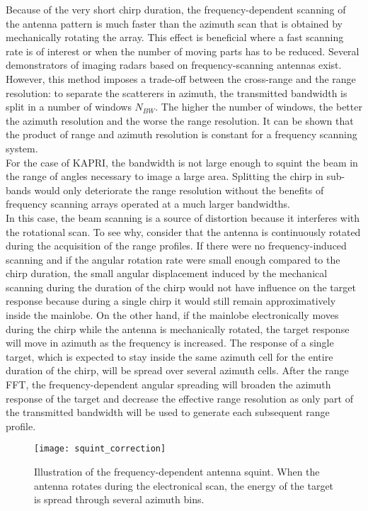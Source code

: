 Because of the very short chirp duration, the frequency-dependent scanning of the antenna pattern is much faster than the azimuth scan that is obtained by mechanically rotating the array. This effect is beneficial where a fast scanning rate is of interest or when the number of moving parts has to be reduced. Several demonstrators of imaging radars based on frequency-scanning antennas exist\cite{Yang2014,Yang2012,Mayer2003,Alvarez2013}. However, this method imposes a trade-off between the cross-range and the range resolution: to separate the scatterers in azimuth, the transmitted bandwidth is split in a number of windows $N_{BW}$. The higher the number of windows, the better the azimuth resolution and the worse the range resolution\cite{Alvarez2013}. It can be shown\cite{Mayer2003} that the product of range and azimuth resolution is constant for a frequency scanning system.\\
For the case of KAPRI, the bandwidth is not large enough to squint the beam in the range of angles necessary to image a large area. Splitting the chirp in sub-bands would only deteriorate the range resolution without the benefits of frequency scanning arrays operated at a much larger bandwidths.\\ 
In this case, the beam scanning is a source of distortion because it interferes with the rotational scan. To see why, consider that the antenna is continuously rotated during the acquisition of the range profiles. If there were no frequency-induced scanning and if the angular rotation rate were small enough compared to the chirp duration, the small angular displacement induced by the mechanical scanning during the duration of the chirp would not have influence on the target response because during a single chirp it would still remain approximatively inside the mainlobe. On the other hand, if the mainlobe electronically moves during the chirp while the antenna is mechanically rotated, the target response will move in azimuth as the frequency is increased. The response of a single target, which is expected to stay inside the same azimuth cell for the entire duration of the chirp, will be spread over several azimuth cells. After the range FFT, the frequency-dependent angular spreading will broaden the azimuth response of the target and decrease the effective range resolution as only part of the transmitted bandwidth will be used to generate each subsequent range profile.\\
\begin{figure}[ht]
	\centering
	\texttt{[image: squint\_correction]}
	\caption{Illustration of the frequency-dependent antenna squint. When the antenna rotates during the electronical scan, the energy of the target is spread through several azimuth bins.}
	\label{fig:squint_correction}
\end{figure}
